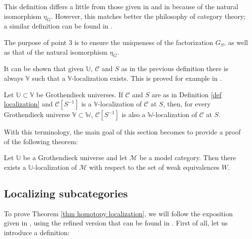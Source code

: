\begin{refsection}
\begin{rmk}
This definition differs a little from those given in \cite{gz} and in \cite{weibel} because of the natural isomorphism $\eta_G$. However, this matches better the philosophy of category theory; a similar definition can be found in \cite[section~7.1]{kashiwara-schapira-categories-and-sheaves}.
\end{rmk}

\begin{rmk}
The purpose of point 3 is to ensure the uniqueness of the factorization $G_S$, as well as that of the natural isomorphism $\eta_G$.
\end{rmk}

\begin{rmk}
It can be shown that given $\mathbb U$, $\mathcal C$ and $S$ as in the previous definition there is always $\mathbb V$ such that a $\mathbb V$-localization exists. This is proved for example in \cite[I.1]{gz}.
\end{rmk}

\begin{rmk} \label{remark enlarging universe}
Let $\mathbb U \subset \mathbb V$ be Grothendieck universes. If $\mathcal C$ and $S$ are as in Definition \ref{def localization} and $\mathcal C[S^{-1}]$ is a $\mathbb V$-localization of $\mathcal C$ at $S$, then, for every Grothendieck universe $\mathbb V \subset \mathbb W$, $\mathcal C[S^{-1}]$ is also a $\mathbb W$-localization of $\mathcal C$ at $S$.
\end{rmk}

With this terminology, the main goal of this section becomes to provide a proof of the following theorem:

\begin{thm} \label{thm homotopy localization}
Let $\mathbb U$ be a Grothendieck universe and let $\mathcal M$ be a model category. Then there exists a $\mathbb U$-localization of $\mathcal M$ with respect to the set of weak equivalences $W$.
\end{thm}

\subsection{Localizing subcategories}

To prove Theorem \ref{thm homotopy localization}, we will follow the exposition given in \cite{dwyer-hirschhorn-kan-smith-homotopy-limit-functors}, using the refined version that can be found in \cite{riehl}.  First of all, let us introduce a definition:


\end{refsection}
